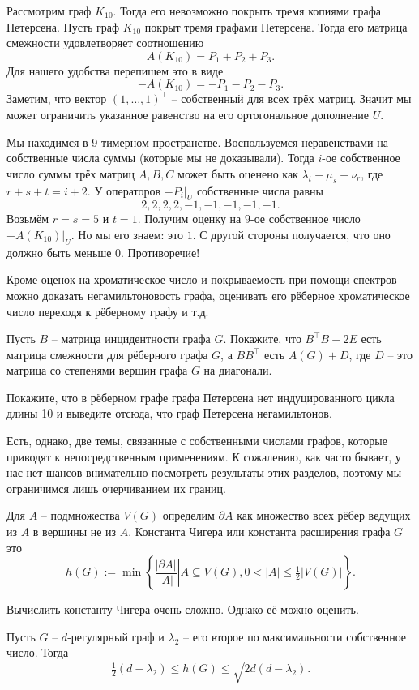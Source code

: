\thrm Рассмотрим граф $K_{10}$. Тогда его невозможно покрыть тремя копиями графа Петерсена.
\ethrm
\proof Пусть граф $K_{10}$ покрыт тремя графами Петерсена. Тогда его матрица смежности удовлетворяет соотношению 
$$A(K_{10})=P_1+P_2+P_3.$$
Для нашего удобства перепишем это в виде 
$$-A(K_{10})=-P_1-P_2-P_3.$$
Заметим, что вектор $(1,\dots,1)^\top$ -- собственный для всех трёх матриц. Значит мы может ограничить указанное равенство на его ортогональное дополнение $U$.

Мы находимся в 9-тимерном пространстве. Воспользуемся неравенствами на собственные числа суммы (которые мы не доказывали). Тогда $i$-ое собственное число  суммы трёх матриц $A,B,C$ может быть оценено как $\lambda_t +\mu_s+ \nu_r$, где $r+s+t=i+2$. У операторов $-P_i|_U$ собственные числа равны $$2,2,2,2,-1,-1,-1,-1,-1.$$
Возьмём  $r=s=5$ и $t=1$. Получим оценку на $9$-ое собственное число $-A(K_{10})|_U$. Но мы его знаем: это $1$. С другой стороны получается, что оно должно быть меньше $0$. Противоречие! 
\endproof

Кроме оценок на хроматическое число и покрываемость при помощи спектров можно доказать негамильтоновость графа, оценивать его рёберное хроматическое число переходя к рёберному графу и т.д.

\zd Пусть $B$ -- матрица инцидентности графа $G$. Покажите, что $B^\top B - 2 E$ есть матрица смежности для рёберного графа $G$, а $B B^\top$ есть $A(G)+D$, где $D$ -- это матрица со степенями вершин графа $G$ на диагонали. 
\ezd

\zd Покажите, что в рёберном графе графа Петерсена нет индуцированного цикла длины 10 и выведите отсюда, что граф Петерсена негамильтонов.
\ezd

Есть, однако, две темы, связанные с собственными числами графов, которые приводят к непосредственным применениям. К сожалению, как часто бывает, у нас нет шансов внимательно посмотреть результаты этих разделов, поэтому мы ограничимся лишь очерчиванием их границ.




\dfn Для $A$ -- подмножества $V(G)$ определим $\partial A$ как множество всех рёбер ведущих из $A$ в вершины не из $A$. Константа Чигера или константа расширения графа  $G$ это 
$$h(G) := \min \left\{ \left. \frac{| \partial A |}{| A |} \right|   A \subseteq V(G), 0 < | A | \leq \tfrac{1}{2} | V(G)| \right\} .$$
\edfn

Вычислить константу Чигера очень сложно. Однако её можно оценить.

\begin{thmm} Пусть $G$ -- $d$-регулярный граф и $\lambda_2$ -- его второе по максимальности собственное число. Тогда
$$\tfrac{1}{2}(d - \lambda_2) \le h(G) \le \sqrt{2d(d - \lambda_2)}.$$
\end{thmm}



